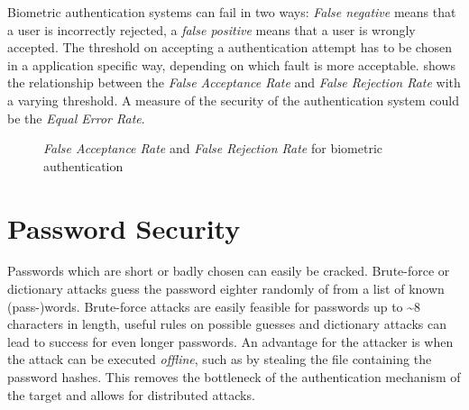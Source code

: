 Biometric authentication systems can fail in two ways: \emph{False negative}
means that a user is incorrectly rejected, a \emph{false positive} means that a
user is wrongly accepted. The threshold on accepting a authentication attempt
has to be chosen in a application specific way, depending on which fault is more
acceptable.  shows the relationship between the
\textit{False Acceptance Rate} and \textit{False Rejection Rate} with a varying
threshold. A measure of the security of the authentication system could be the
\textit{Equal Error Rate}.
\begin{figure}
    \centering
    \caption{\textit{False Acceptance Rate} and \textit{False Rejection Rate}
    for biometric authentication}
    \label{fig:eer}
\end{figure}

\section{Password Security}
Passwords which are short or badly chosen can easily be cracked. Brute-force or
dictionary attacks guess the password eighter randomly of from a list of known
(pass-)words. Brute-force attacks are easily feasible for passwords up to
\textasciitilde 8 characters in length, useful rules on possible guesses and
dictionary attacks can lead to success for even longer passwords. An advantage
for the attacker is when the attack can be executed \textit{offline}, such as by
stealing the file containing the password hashes. This removes the bottleneck of
the authentication mechanism of the target and allows for distributed attacks.

